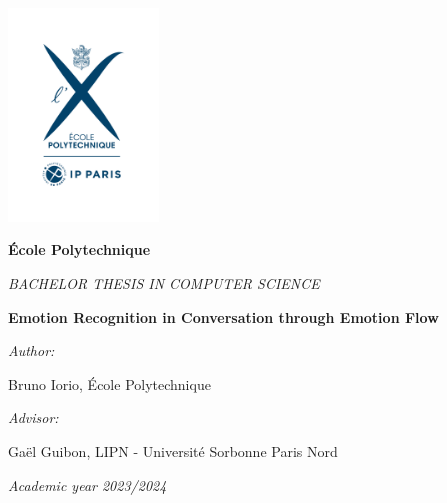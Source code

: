 \documentclass[oneside, a4paper, onecolumn, 11pt]{article}
\newcommand{\thesistitle}[0]{Emotion Recognition in Conversation through Emotion Flow}
\newcommand{\authorname}[0]{Bruno Iorio}
\newcommand{\supervisor}[0]{Gaël Guibon}
\newcommand{\supervisorinstitution}[0]{LIPN - Université Sorbonne Paris Nord}
\begin{document}



\hspace{0pt}
\vfill

\begin{center}

\includegraphics[width=0.3\textwidth]{logo-EP-vertical}

\vspace*{2em}
%
{\large
\textbf{\'Ecole Polytechnique}

\vspace*{1em}
\textit{BACHELOR THESIS IN COMPUTER SCIENCE}


\vspace*{3em}
{\Huge \textbf{\thesistitle}}
\vspace*{3em}



\textit{Author:}

\vspace*{1em}
\authorname{}, \'Ecole Polytechnique

\vspace*{2em}
%
{\textit{Advisor:}}

\vspace*{1em}
\supervisor{}, \supervisorinstitution{}
}

\vspace*{2em}
\textit{Academic year 2023/2024}

\end{center}

\vfill
\hspace{0pt}
\end{document}
